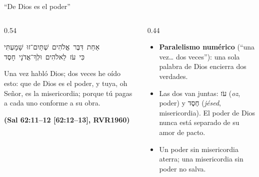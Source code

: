 \documentclass[hyperref={bookmarks=false},aspectratio=169]{beamer}
\newcommand{\heb}[1]{\mbox{\foreignlanguage{hebrew}{#1}}}
\newcommand{\fuente}[1]{\par\hfill{\upshape\bfseries\footnotesize\textcolor{azul}{#1}}}
\newcommand{\destacar}[1]{\textbf{\textcolor{azul}{#1}}}
\begin{document}
\begin{frame}{``De Dios es el poder''}
\begin{columns}[c,onlytextwidth]
\begin{column}{0.54\textwidth}
\begin{center}\small\heb{אַחַת דִּבֶּר אֱלֹהִים שְׁתַּיִם־זוּ שָׁמָעְתִּי}\\[1pt]\heb{כִּי עֹז לֵאלֹהִים וּלְךָ־אֲדֹנָי חָסֶד}\end{center}
\begin{cita}Una vez habló Dios; dos veces he oído esto: que de Dios es el poder, y tuya, oh Señor, es la misericordia; porque tú pagas a cada uno conforme a su obra.\fuente{(Sal 62:11--12 [62:12--13], RVR1960)}\end{cita}
\end{column}
\begin{column}{0.44\textwidth}\small
\begin{itemize}
\item \destacar{Paralelismo numérico} (``una vez\ldots{} dos veces''): una sola palabra de Dios encierra dos verdades.
\item Las dos van juntas: \heb{עֹז} (\emph{oz}, poder) y \heb{חֶסֶד} (\emph{jésed}, misericordia). El poder de Dios nunca está separado de su amor de pacto.
\item Un poder sin misericordia aterra; una misericordia sin poder no salva.
\end{itemize}
\end{column}
\end{columns}
\end{frame}
\end{document}
